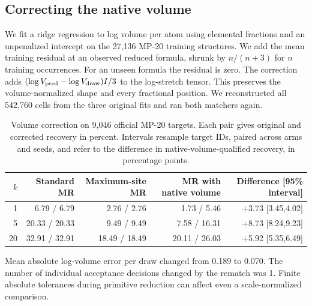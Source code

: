 \subsection{Correcting the native volume}
We fit a ridge regression to log volume per atom using elemental fractions and an unpenalized intercept on the 27,136 MP-20 training structures. We add the mean training residual at an observed reduced formula, shrunk by $n/(n+3)$ for $n$ training occurrences. For an unseen formula the residual is zero. The correction adds $(\log V_{\rm pred}-\log V_{\rm draw})I/3$ to the log-stretch tensor. This preserves the volume-normalized shape and every fractional position. We reconstructed all 542,760 cells from the three original fits and ran both matchers again.
\begin{table}[!htbp]\centering\small
\caption{Volume correction on 9,046 official MP-20 targets. Each pair gives original and corrected recovery in percent. Intervals resample target IDs, paired across arms and seeds, and refer to the difference in native-volume-qualified recovery, in percentage points.}\label{t:correct-volume}
\begin{tabular}{rrrrr}\hline $k$ & Standard MR & Maximum-site MR & MR with native volume & Difference [95\% interval]\\\hline
1 & 6.79 / 6.79 & 2.76 / 2.76 & 1.73 / 5.46 & +3.73 [3.45,4.02]\\
5 & 20.33 / 20.33 & 9.49 / 9.49 & 7.58 / 16.31 & +8.73 [8.24,9.23]\\
20 & 32.91 / 32.91 & 18.49 / 18.49 & 20.11 / 26.03 & +5.92 [5.35,6.49]\\
\hline\end{tabular}\end{table}
Mean absolute log-volume error per draw changed from 0.189 to 0.070. The number of individual acceptance decisions changed by the rematch was 1. Finite absolute tolerances during primitive reduction can affect even a scale-normalized comparison.
